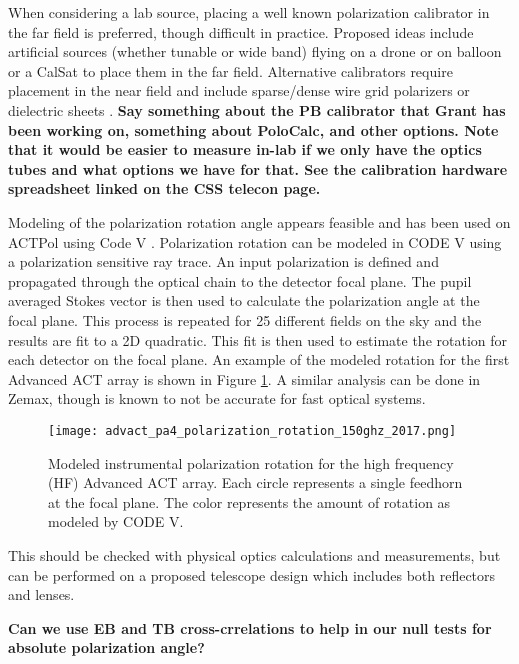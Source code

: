 When considering a lab source, placing a well known polarization calibrator in
the far field is preferred, though difficult in practice.  Proposed ideas
include artificial sources \cite{nati_2017} (whether tunable or wide band)
flying on a drone or on balloon or a CalSat to place them in the far field.
Alternative calibrators require placement in the near field and include
sparse/dense wire grid polarizers or dielectric sheets \cite{Takahashi2010,
2016arXiv160701825K}. \textbf{Say something about the PB calibrator that Grant
has been working on, something about PoloCalc, and other options. Note that it
would be easier to measure in-lab if we only have the optics tubes and what
options we have for that. See the calibration hardware spreadsheet linked on
the CSS telecon page.}

Modeling of the polarization rotation angle appears feasible and has been used
on ACTPol using Code V \cite{2016arXiv160701825K}. Polarization rotation can be
modeled in CODE V using a polarization sensitive ray trace. An input
polarization is defined and propagated through the optical chain to the
detector focal plane. The pupil averaged Stokes vector is then used to
calculate the polarization angle at the focal plane. This process is repeated
for 25 different fields on the sky and the results are fit to a 2D quadratic.
This fit is then used to estimate the rotation for each detector on the focal
plane. An example of the modeled rotation for the first Advanced ACT array is
shown in Figure \ref{fig:advact_pa4_pol_rotation}. A similar analysis can be
done in Zemax, though is known to not be accurate for fast optical systems.

\begin{figure}[h!]
\begin{center}
\texttt{[image: advact\_pa4\_polarization\_rotation\_150ghz\_2017.png]}
\caption{Modeled instrumental polarization rotation for the high frequency (HF)
Advanced ACT array. Each circle represents a single feedhorn at the focal
plane. The color represents the amount of rotation as modeled by CODE V.}
\label{fig:advact_pa4_pol_rotation}
\end{center}
\end{figure}

This should be checked with physical optics calculations and measurements, but
can be performed on a proposed telescope design which includes both reflectors
and lenses.

\textbf{Can we use EB and TB cross-crrelations to help in our null tests for
absolute polarization angle?}

